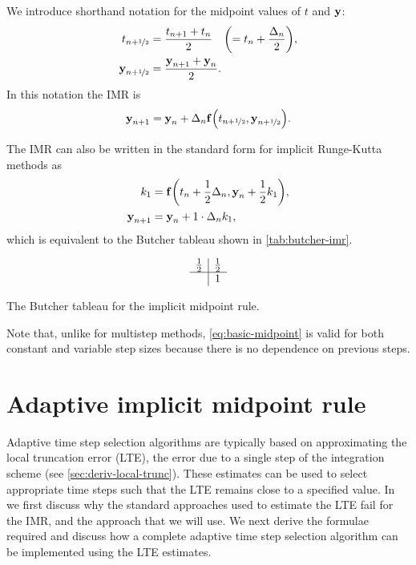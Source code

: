 We introduce shorthand notation for the midpoint values of $t$ and $\boldsymbol{\mathrm{y}}$:
\begin{equation}
  \begin{aligned}
    t_{n+\nicefrac{1}{2}} & = \frac{t_{n+1} + t_n}{2} \quad {\left( = t_n + \frac{\Delta_{n}}{2} \right)}, \\
    \boldsymbol{\mathrm{y}}_{n+\nicefrac{1}{2}} &= \frac{\boldsymbol{\mathrm{y}}_{n+1} + \boldsymbol{\mathrm{y}}_n}{2}.
  \end{aligned}
\end{equation}
In this notation the IMR is
\begin{equation}
  \boldsymbol{\mathrm{y}}_{n+1} = \boldsymbol{\mathrm{y}}_n + \Delta_{n} {\boldsymbol{\mathrm{f}}{\left( t_{n+\nicefrac{1}{2}}, \boldsymbol{\mathrm{y}}_{n+\nicefrac{1}{2}} \right)}}.
  \label{eq:basic-midpoint}
\end{equation}

The IMR can also be written in the standard form for implicit Runge-Kutta methods as
\begin{equation}
  \begin{aligned}
    k_1 &= {\boldsymbol{\mathrm{f}}{\left( t_n + \frac{1}{2} \Delta_{n}, \boldsymbol{\mathrm{y}}_n + \frac{1}{2} k_1 \right)}}, \\
    \boldsymbol{\mathrm{y}}_{n+1} &= \boldsymbol{\mathrm{y}}_n + 1 \cdot \Delta_{n} k_1,
  \end{aligned}
\end{equation}
which is equivalent to the Butcher tableau \cite[135]{HairerNorsettWanner} shown in \cref{tab:butcher-imr}.

\begin{table}
  \begin{equation*}
    \begin{array}{c|c}
      \frac{1}{2}  &     \frac{1}{2}  \\
      \hline
                   & 1 \\
    \end{array}
  \end{equation*}
  \caption{The Butcher tableau for the implicit midpoint rule.}
  \label{tab:butcher-imr}
\end{table}

Note that, unlike for multistep methods, \cref{eq:basic-midpoint} is valid for both constant and variable step sizes because there is no dependence on previous steps.


\section{Adaptive implicit midpoint rule}
\label{sec:adapt-impl-midp}

Adaptive time step selection algorithms are typically based on approximating the local truncation error (LTE), the error due to a single step of the integration scheme (see \cref{sec:deriv-local-trunc}).
These estimates can be used to select appropriate time steps such that the LTE remains close to a specified value.
In  we first discuss why the standard approaches used to estimate the LTE fail for the IMR, and the approach that we will use.
We next derive the formulae required and discuss how a complete adaptive time step selection algorithm can be implemented using the LTE estimates.


